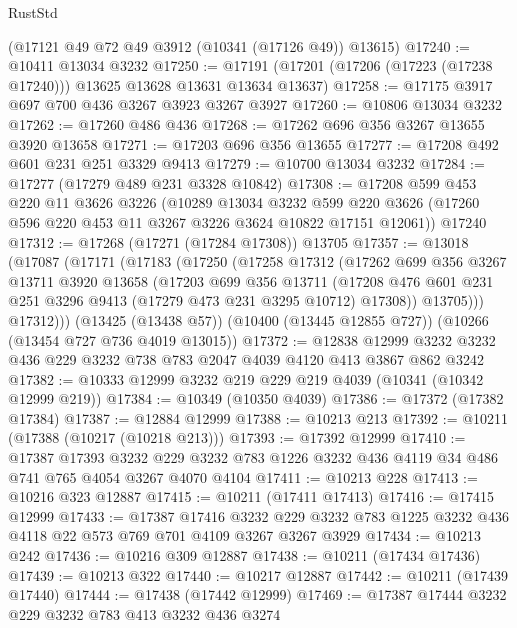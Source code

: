 \begin{lexlean}{RustStd}
\begin{coremodule}
{\begin{coremodule}
{{{{{{{{{{{{{{{{{{{{{{{{{    (@17121 @49 @72 @49 @3912 (@10341 (@17126 @49)) @13615)
@17240 := @10411 @13034 @3232
@17250 := @17191 (@17201 (@17206 (@17223 (@17238 @17240))) @13625 @13628 @13631 @13634 @13637)
@17258 := @17175 @3917 @697 @700 @436 @3267 @3923 @3267 @3927
@17260 := @10806 @13034 @3232
@17262 := @17260 @486 @436
@17268 := @17262 @696 @356 @3267 @13655 @3920 @13658
@17271 := @17203 @696 @356 @13655
@17277 := @17208 @492 @601 @231 @251 @3329 @9413
@17279 := @10700 @13034 @3232
@17284 := @17277 (@17279 @489 @231 @3328 @10842)
@17308 := @17208
    @599
    @453
    @220
    @11
    @3626
    @3226
    (@10289
      @13034
      @3232
      @599
      @220
      @3626
      (@17260 @596 @220 @453 @11 @3267 @3226 @3624 @10822 @17151 @12061))
    @17240
@17312 := @17268 (@17271 (@17284 @17308)) @13705
@17357 := @13018
    (@17087
      (@17171
        (@17183
          (@17250
            (@17258
              @17312
              (@17262
                @699
                @356
                @3267
                @13711
                @3920
                @13658
                (@17203
                  @699
                  @356
                  @13711
                  (@17208 @476 @601 @231 @251 @3296 @9413 (@17279 @473 @231 @3295 @10712) @17308))
                @13705)))
          @17312)))
    (@13425 (@13438 @57))
    (@10400 (@13445 @12855 @727))
    (@10266 (@13454 @727 @736 @4019 @13015))
@17372 := @12838
    @12999
    @3232
    @3232
    @436
    @229
    @3232
    @738
    @783
    @2047
    @4039
    @4120
    @413
    @3867
    @862
    @3242
@17382 := @10333 @12999 @3232 @219 @229 @219 @4039 (@10341 (@10342 @12999 @219))
@17384 := @10349 (@10350 @4039)
@17386 := @17372 (@17382 @17384)
@17387 := @12884 @12999
@17388 := @10213 @213
@17392 := @10211 (@17388 (@10217 (@10218 @213)))
@17393 := @17392 @12999
@17410 := @17387
    @17393
    @3232
    @229
    @3232
    @783
    @1226
    @3232
    @436
    @4119
    @34
    @486
    @741
    @765
    @4054
    @3267
    @4070
    @4104
@17411 := @10213 @228
@17413 := @10216 @323 @12887
@17415 := @10211 (@17411 @17413)
@17416 := @17415 @12999
@17433 := @17387
    @17416
    @3232
    @229
    @3232
    @783
    @1225
    @3232
    @436
    @4118
    @22
    @573
    @769
    @701
    @4109
    @3267
    @3267
    @3929
@17434 := @10213 @242
@17436 := @10216 @309 @12887
@17438 := @10211 (@17434 @17436)
@17439 := @10213 @322
@17440 := @10217 @12887
@17442 := @10211 (@17439 @17440)
@17444 := @17438 (@17442 @12999)
@17469 := @17387
    @17444
    @3232
    @229
    @3232
    @783
    @413
    @3232
    @436
    @3274
}}}}}}}}}}}}}}}}}}}}}}}}}
\end{coremodule}}
\end{coremodule}
\end{lexlean}
